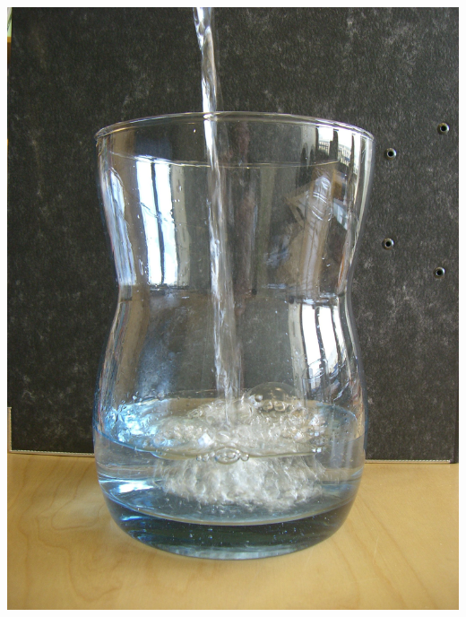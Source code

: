 \documentclass{cssheet}
\begin{document}
\begin{aufgabe}[Füllgraphen]
\begin{minipage}{.33\textwidth}
		\includegraphics[width=\linewidth]{Gefaess_C_1.jpg}
	\end{minipage}
\end{aufgabe}
\end{document}
